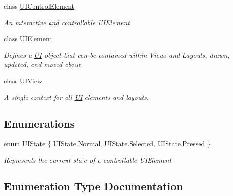 \begin{DoxyCompactItemize}
class \hyperlink{class_midnight_blue_1_1_engine_1_1_u_i_1_1_u_i_control_element}{U\+I\+Control\+Element}
\begin{DoxyCompactList}\small\item\em An interactive and controllable \hyperlink{class_midnight_blue_1_1_engine_1_1_u_i_1_1_u_i_element}{U\+I\+Element} \end{DoxyCompactList}\item 
class \hyperlink{class_midnight_blue_1_1_engine_1_1_u_i_1_1_u_i_element}{U\+I\+Element}
\begin{DoxyCompactList}\small\item\em Defines a \hyperlink{namespace_midnight_blue_1_1_engine_1_1_u_i}{UI} object that can be contained within Views and Layouts, drawn, updated, and moved about \end{DoxyCompactList}\item 
class \hyperlink{class_midnight_blue_1_1_engine_1_1_u_i_1_1_u_i_view}{U\+I\+View}
\begin{DoxyCompactList}\small\item\em A single context for all \hyperlink{namespace_midnight_blue_1_1_engine_1_1_u_i}{UI} elements and layouts. \end{DoxyCompactList}\end{DoxyCompactItemize}
\subsection*{Enumerations}
\begin{DoxyCompactItemize}
\item 
enum \hyperlink{namespace_midnight_blue_1_1_engine_1_1_u_i_ac8cda7dc9a469f43de5392ebb537ff92}{U\+I\+State} \{ \hyperlink{namespace_midnight_blue_1_1_engine_1_1_u_i_ac8cda7dc9a469f43de5392ebb537ff92a960b44c579bc2f6818d2daaf9e4c16f0}{U\+I\+State.\+Normal}, 
\hyperlink{namespace_midnight_blue_1_1_engine_1_1_u_i_ac8cda7dc9a469f43de5392ebb537ff92a91b442d385b54e1418d81adc34871053}{U\+I\+State.\+Selected}, 
\hyperlink{namespace_midnight_blue_1_1_engine_1_1_u_i_ac8cda7dc9a469f43de5392ebb537ff92ad78a68f6a85421ae121c2cb5b73a1040}{U\+I\+State.\+Pressed}
 \}\begin{DoxyCompactList}\small\item\em Represents the current state of a controllable U\+I\+Element \end{DoxyCompactList}
\end{DoxyCompactItemize}


\subsection{Enumeration Type Documentation}
\hypertarget{namespace_midnight_blue_1_1_engine_1_1_u_i_ac8cda7dc9a469f43de5392ebb537ff92}{}\label{namespace_midnight_blue_1_1_engine_1_1_u_i_ac8cda7dc9a469f43de5392ebb537ff92} 
